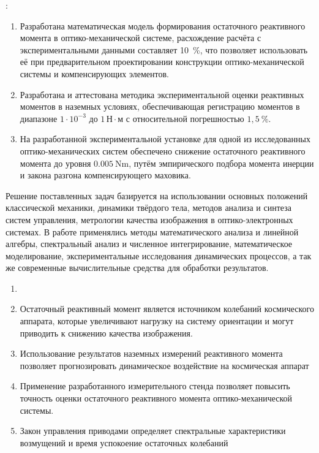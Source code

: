 {\influence}:

\begin{enumerate}[beginpenalty=10000] %
	\item Разработана математическая модель формирования остаточного реактивного момента в оптико-механической системе, расхождение расчёта с экспериментальными данными составляет 10~\%, что позволяет использовать её при предварительном проектировании конструкции оптико-механической системы и компенсирующих элементов.
	\item Разработана и аттестована методика экспериментальной оценки реактивных моментов в наземных условиях, обеспечивающая регистрацию моментов в диапазоне $1 \cdot 10^{-3}$ до $1\,\text{Н}\cdot\text{м}$ с относительной погрешностью $1,5 ~\%$.
	\item На разработанной экспериментальной установке для одной из исследованных оптико-механических систем обеспечено снижение остаточного реактивного момента до уровня $\SI{0,005}{\newton\meter}$, путём эмпирического подбора момента инерции и закона разгона компенсирующего маховика.
\end{enumerate}


{\methods} Решение поставленных задач базируется на использовании основных положений классической механики, динамики твёрдого тела, методов анализа и синтеза систем управления, метрологии качества изображения в оптико-электронных системах. В работе применялись методы математического анализа и линейной алгебры, спектральный анализ и численное интегрирование, математическое моделирование, экспериментальные исследования динамических процессов, а так же современные вычислительные средства для обработки результатов.


{}
\begin{enumerate}[beginpenalty=10000] %
  \item {}
  \item Остаточный реактивный момент является источником колебаний космического аппарата, которые увеличивают нагрузку на систему ориентации и могут приводить к снижению качества изображения.
  \item Использование результатов наземных измерений реактивного момента позволяет прогнозировать динамическое воздействие на космическая аппарат
  \item Применение разработанного измерительного стенда позволяет повысить точность оценки остаточного реактивного момента оптико-механической системы.
  \item Закон управления приводами определяет спектральные характеристики возмущений и время успокоение остаточных колебаний 
\end{enumerate}

